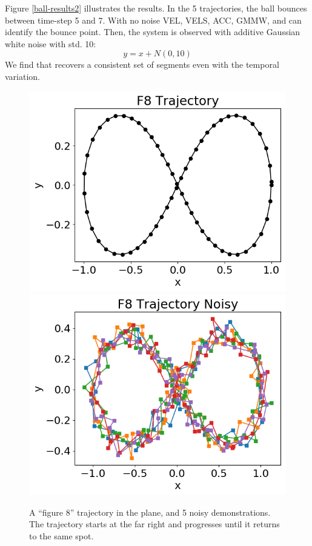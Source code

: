 Figure \ref{ball-results2} illustrates the results.
In the 5 trajectories, the ball bounces between time-step 5 and 7.
With no noise VEL, VELS, ACC, GMMW, and \tsc can identify the bounce point.
Then, the system is observed with additive Gaussian white noise with std. 10:
\[
y = x + N(0,10)
\]
We find that \tsc recovers a consistent set of segments even with the temporal variation.

\begin{figure}[ht!]%
\centering
\includegraphics[width=0.48\columnwidth]{tsc-experiments/a1.png}
\includegraphics[width=0.48\columnwidth]{tsc-experiments/b1.png}
\caption{A ``figure 8'' trajectory in the plane, and 5 noisy demonstrations. The trajectory starts at the far right and progresses until it returns to the same spot. \label{f8-diagram}}
\end{figure}

